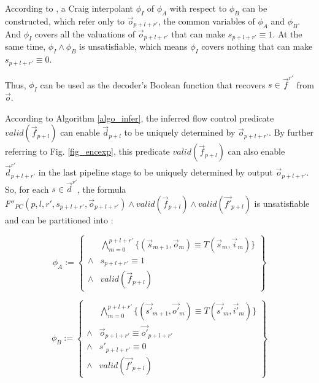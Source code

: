 \documentclass[conference]{IEEEtran}
\begin{document}

According to \cite{InterpBoolFunction},
a Craig interpolant $\phi_I$ of $\phi_A$ with respect to $\phi_B$ can be constructed,
which refer only to $\vec{o}_{p+l+r'}$,
the common variables of $\phi_A$ and $\phi_B$.
And $\phi_I$ covers all the valuations of $\vec{o}_{p+l+r'}$ that can make $s_{p+l+r'}\equiv 1$.
At the same time,
$\phi_I\wedge \phi_B$ is unsatisfiable,
which means $\phi_I$ covers nothing that can make $s_{p+l+r'}\equiv 0$.

Thus,
$\phi_I$ can be used as the decoder's Boolean function 
that recovers $s\in \vec{f}^{r'}$ from $\vec{o}$.

According to Algorithm \ref{algo_infer},
the inferred flow control predicate $valid(\vec{f}_{p+l})$ can
enable $\vec{d}_{p+l}$ to be uniquely determined by $\vec{o}_{p+l+r'}$.
By further referring to Fig. \ref{fig_encexp},
this predicate $valid(\vec{f}_{p+l})$ can also enable $\vec{d}^{r'}_{p+l+r'}$ 
in the last pipeline stage to be uniquely determined by output $\vec{o}_{p+l+r'}$.
So,
for each $s\in \vec{d}^{r'}$,
the formula $F''_{PC}(p,l,r',s_{p+l+r'},\vec{o}_{p+l+r'})\wedge valid(\vec{f}_{p+l})\wedge valid(\vec{f'}_{p+l})$ is unsatisfiable 
and can be partitioned into :

\begin{equation}\label{eqn_char_dlast_A}
 \phi_A := 
 \left\{
\begin{array}{cc}
&\bigwedge_{m=0}^{p+l+r'}
\{
(\vec{s}_{m+1},\vec{o}_m)\equiv T(\vec{s}_m,\vec{i}_m)
\}
\\
\wedge& s_{p+l+r'}\equiv 1 \\
\wedge& valid(\vec{f}_{p+l})
\end{array}
\right\}
\end{equation}

\begin{equation}\label{eqn_char_dlast_B}
\phi_B := 
\left\{
\begin{array}{cc}
&\bigwedge_{m=0}^{p+l+r'}
\{
(\vec{s'}_{m+1},\vec{o'}_m)\equiv T(\vec{s'}_m,\vec{i'}_m)
\}
\\
\wedge&\vec{o}_{p+l+r'}\equiv \vec{o'}_{p+l+r'} \\
\wedge& s'_{p+l+r'}\equiv 0 \\
\wedge& valid(\vec{f'}_{p+l})
\end{array}
\right\}
\end{equation}
\end{document}
